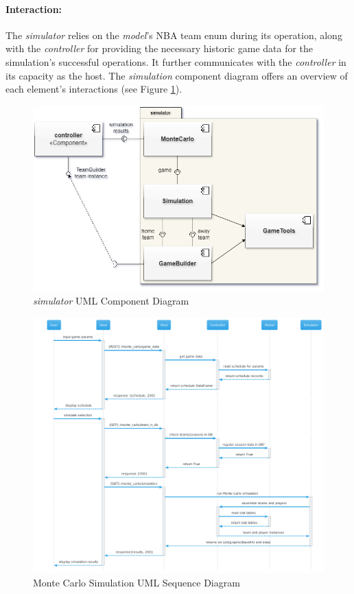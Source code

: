 \documentclass{thesis-ekf}
\theoremstyle{definition}
\theoremstyle{remark}
\begin{document}
{\paragraph{Interaction:}
The \emph{simulator} relies on the \emph{model}'s NBA team enum during its operation, along with the \emph{controller} for providing the necessary historic game data for the simulation's successful operations. It further communicates with the \emph{controller} in its capacity as the host. The \emph{simulation} component diagram offers an overview of each element's interactions (see Figure \ref{img-simulation-component}).
\begin{figure}[th!]
	\centering
	\includegraphics[width=0.7\linewidth]{img/component/component_simulation}
	\caption{\emph{simulator} UML Component Diagram}
	\label{img-simulation-component}
\end{figure}
\begin{figure}[th!]
	\centering
	\includegraphics[width=1\linewidth]{img/sequence/monte_carlo/monte_carlo_sequence_cerulean}
	\caption{Monte Carlo Simulation UML Sequence Diagram}
	\label{img-monte-carlo-sequence}
\end{figure}


}
\end{document}
